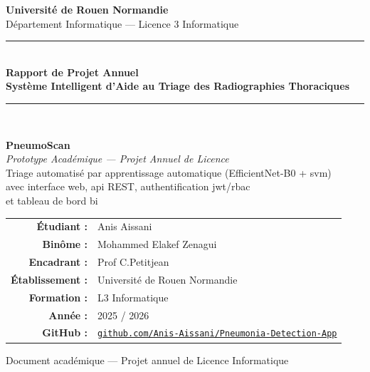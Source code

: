 \documentclass[12pt, a4paper]{report}
\begin{document}

\begin{titlepage}
  \begin{center}
    \vspace*{0.5cm}
    {\large \textbf{Université de Rouen Normandie}}\\[0.2cm]
    {\small Département Informatique --- Licence 3 Informatique}\\[1.5cm]

    \rule{\linewidth}{1.5pt}\\[0.4cm]
    {\Huge \textbf{\textcolor{primary}{Rapport de Projet Annuel}}}\\[0.3cm]
    {\large \textbf{Système Intelligent d'Aide au Triage des Radiographies Thoraciques}}\\[0.2cm]
    \rule{\linewidth}{1.5pt}\\[1.2cm]

    \begin{tcolorbox}[
      enhanced, arc=4pt,
      colback=gray!5, colframe=primary,
      width=0.85\textwidth
    ]
      \centering
      {\Huge \textbf{\textcolor{primary}{PneumoScan}}}\\[0.2cm]
      {\large \textit{Prototype Académique --- Projet Annuel de Licence}}\\[0.3cm]
      {\normalsize
        Triage automatisé par apprentissage automatique (EfficientNet-B0 + \acrshort{svm})\\
        avec interface web, \acrshort{api} REST, authentification \acrshort{jwt}/\acrshort{rbac}\\
        et tableau de bord \acrshort{bi}
      }
    \end{tcolorbox}

    \vspace{1.5cm}

    \begin{tabular}{rl}
      \textbf{Étudiant :}      & Anis Aissani \\[3pt]
      \textbf{Binôme :}        & Mohammed Elakef Zenagui \\[3pt]
      \textbf{Encadrant :}     & Prof C.Petitjean \\[3pt]
      \textbf{Établissement :} & Université de Rouen Normandie \\[3pt]
      \textbf{Formation :}     & L3 Informatique \\[3pt]
      \textbf{Année :}         & 2025 / 2026 \\[3pt]
      \textbf{GitHub :}        & \href{https://github.com/Anis-Aissani/Pneumonia-Detection-App}{\texttt{github.com/Anis-Aissani/Pneumonia-Detection-App}} \\
    \end{tabular}

    \vfill
    {\small \textcolor{muted}{Document académique --- Projet annuel de Licence Informatique}}
  \end{center}
\end{titlepage}
\end{document}
